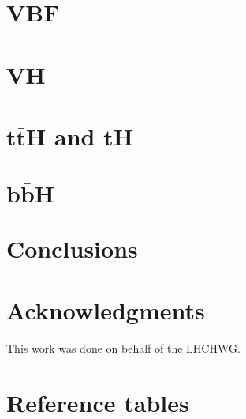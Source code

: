 \documentclass[11pt]{article}
\begin{document}
\section{VBF}
\label{sec:VBF}


\section{VH}
\label{sec:VH}


\section{$\boldsymbol{t\bar{t}H}$ and $\boldsymbol{tH}$}
\label{sec:ttH}


\section{$\boldsymbol{b\bar{b}H}$}
\label{sec:bbH}


\section{Conclusions}
\label{sec:conclusions}


\section*{Acknowledgments}
This work was done on behalf of the LHCHWG.
\newpage
\appendix
\section{Reference tables}
\label{app:tables}



\end{document}
